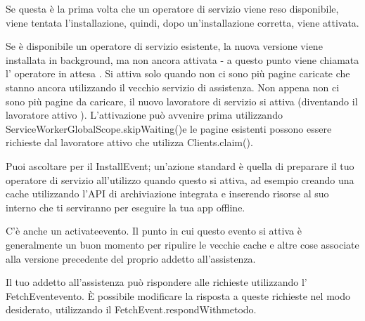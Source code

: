 \documentclass[italian]{article}
\begin{document}
Se questa è la prima volta che un operatore di servizio viene reso disponibile, viene tentata l'installazione, quindi, dopo un'installazione corretta, viene attivata.

Se è disponibile un operatore di servizio esistente, la nuova versione viene installata in background, ma non ancora attivata - a questo punto viene chiamata l' operatore in attesa . Si attiva solo quando non ci sono più pagine caricate che stanno ancora utilizzando il vecchio servizio di assistenza. Non appena non ci sono più pagine da caricare, il nuovo lavoratore di servizio si attiva (diventando il lavoratore attivo ). L'attivazione può avvenire prima utilizzando ServiceWorkerGlobalScope.skipWaiting()e le pagine esistenti possono essere richieste dal lavoratore attivo che utilizza Clients.claim().

Puoi ascoltare per il InstallEvent; un'azione standard è quella di preparare il tuo operatore di servizio all'utilizzo quando questo si attiva, ad esempio creando una cache utilizzando l'API di archiviazione integrata e inserendo risorse al suo interno che ti serviranno per eseguire la tua app offline.

C'è anche un activateevento. Il punto in cui questo evento si attiva è generalmente un buon momento per ripulire le vecchie cache e altre cose associate alla versione precedente del proprio addetto all'assistenza.

Il tuo addetto all'assistenza può rispondere alle richieste utilizzando l' FetchEventevento. È possibile modificare la risposta a queste richieste nel modo desiderato, utilizzando il FetchEvent.respondWithmetodo.
\end{document}
